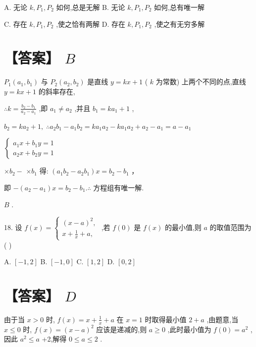 \documentclass[10pt]{article}
\newcommand*\circled[1]{\tikz[baseline=(char.base)]{\node[shape=circle,draw,inner sep=1.5pt] (char) {\small #1};}}
\begin{document}
A. 无论 \(k,{P}_{1},{P}_{2}\) 如何,总是无解 B. 无论 \(k,{P}_{1},{P}_{2}\) 如何,总有唯一解

C. 存在 \(k,{P}_{1},{P}_{2}\) ,使之恰有两解 D. 存在 \(k,{P}_{1},{P}_{2}\) ,使之有无穷多解

\section*{【答案】 \(B\)}

\({P}_{1}\left( {{a}_{1},{b}_{1}}\right)\) 与 \({P}_{2}\left( {{a}_{2},{b}_{2}}\right)\) 是直线 \(y = {kx} + 1\) ( \(k\) 为常数) 上两个不同的点,直线 \(y = {kx} + 1\) 的斜率存在,

\(\therefore k = \frac{{b}_{2} - {b}_{1}}{{a}_{2} - {a}_{1}}\) ,即 \({a}_{1} \neq  {a}_{2}\) ,并且 \({b}_{1} = k{a}_{1} + 1\) ,

\({b}_{2} = k{a}_{2} + 1,\;\therefore {a}_{2}{b}_{1} - {a}_{1}{b}_{2} = k{a}_{1}{a}_{2} - k{a}_{1}{a}_{2} + {a}_{2} - {a}_{1} = a - {a}_{1}\)

\(\left\{  \begin{array}{l} {a}_{1}x + {b}_{1}y = 1 \\  {a}_{2}x + {b}_{2}y = 1 \end{array}\right.\)

 \circled{1}  \(\times  {b}_{2} -\)  \circled{2}  \(\times  {b}_{1}\) 得: \(\left( {{a}_{1}{b}_{2} - {a}_{2}{b}_{1}}\right) x = {b}_{2} - {b}_{1}\) ，

即 \(- \left( {{a}_{2} - {a}_{1}}\right) x = {b}_{2} - {b}_{1}.\therefore\) 方程组有唯一解.

\(B\) .

18. 设 \(f\left( x\right)  = \left\{  \begin{array}{l} {\left( x - a\right) }^{2}, \\  x + \frac{1}{x} + a, \end{array}\right.\) ,若 \(f\left( 0\right)\) 是 \(f\left( x\right)\) 的最小值,则 \(a\) 的取值范围为(   )

A. \(\left\lbrack  {-1,2}\right\rbrack\) B. \(\left\lbrack  {-1,0}\right\rbrack\) C. \(\left\lbrack  {1,2}\right\rbrack\) D. \(\left\lbrack  {0,2}\right\rbrack\)

\section*{【答案】 \(D\)}

由于当 \(x > 0\) 时, \(f\left( x\right)  = x + \frac{1}{x} + a\) 在 \(x = 1\) 时取得最小值 \(2 + a\) ,由题意,当 \(x \leq  0\) 时, \(f\left( x\right)  = {\left( x - a\right) }^{2}\) 应该是递减的,则 \(a \geq  0\) ,此时最小值为 \(f\left( 0\right)  = {a}^{2}\) ,因此 \({a}^{2} \leq  a\) +2,解得 \(0 \leq  a \leq  2\) .
\end{document}

